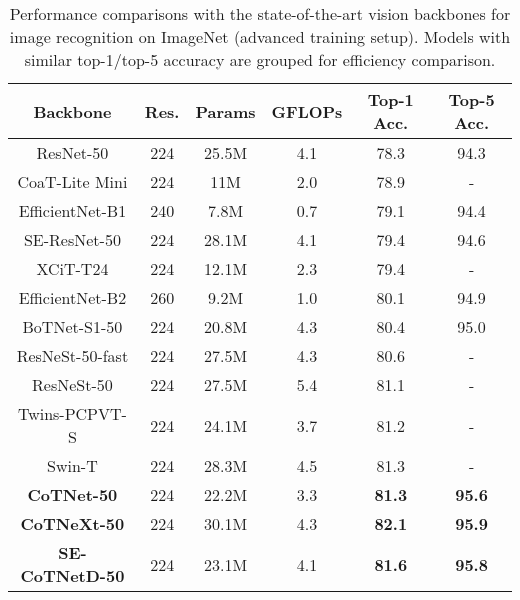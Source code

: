 \documentclass[10pt,twocolumn,letterpaper]{article}
\begin{document}
\begin{table}[!tb]\small
  \centering
  \caption{Performance comparisons with the state-of-the-art vision backbones for image recognition on ImageNet (advanced training setup). Models with similar top-1/top-5 accuracy are grouped for efficiency comparison.}
  \setlength{\tabcolsep}{0.5pt}
\begin{tabular}{c|c|cc|cc}
\Xhline{2\arrayrulewidth}
Backbone                                        & Res. & Params & GFLOPs & Top-1 Acc. & Top-5 Acc. \\ \hline
ResNet-50 \cite{he2016deep}                     & 224  & 25.5M  & 4.1    & 78.3       & 94.3       \\
CoaT-Lite Mini \cite{xu2021co}                  & 224  & 11M    & 2.0    & 78.9       & -          \\
EfficientNet-B1 \cite{tan2019efficientnet}      & 240  & 7.8M   & 0.7    & 79.1       & 94.4       \\
SE-ResNet-50 \cite{hu2018squeeze}               & 224  & 28.1M  & 4.1    & 79.4       & 94.6       \\
XCiT-T24 \cite{el2021xcit}                      & 224  & 12.1M  & 2.3    & 79.4       & -          \\
EfficientNet-B2 \cite{tan2019efficientnet}      & 260  & 9.2M   & 1.0    & 80.1       & 94.9       \\
BoTNet-S1-50 \cite{srinivas2021bottleneck}      & 224  & 20.8M  & 4.3    & 80.4       & 95.0       \\
ResNeSt-50-fast \cite{zhang2020resnest}         & 224  & 27.5M  & 4.3    & 80.6       & -          \\
ResNeSt-50      \cite{zhang2020resnest}         & 224  & 27.5M  & 5.4    & 81.1       & -          \\
Twins-PCPVT-S \cite{chu2021twins}               & 224  & 24.1M  & 3.7    & 81.2       & -          \\
Swin-T    \cite{liu2021swin}                    & 224  & 28.3M  & 4.5    & 81.3       & -          \\    \hline
\textbf{CoTNet-50}                              & 224  & 22.2M  & 3.3    & \textbf{81.3}  & \textbf{95.6}       \\
\textbf{CoTNeXt-50}                             & 224  & 30.1M  & 4.3    & \textbf{82.1}  & \textbf{95.9}       \\
\textbf{SE-CoTNetD-50}                          & 224  & 23.1M  & 4.1    & \textbf{81.6}  & \textbf{95.8}  \\ \hline\hline

\end{tabular}
\end{table}
\end{document}
